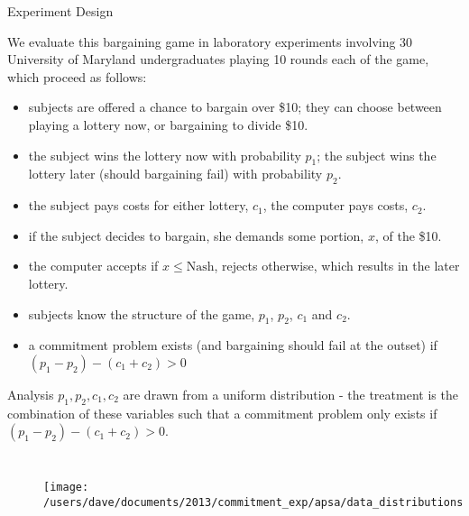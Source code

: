\documentclass[final]{beamer}
\newlength{\twocolwid}
\begin{document}
\begin{frame}[t]
\begin{columns}[t]
\begin{column}{\twocolwid}
\begin{block}{Experiment Design}
  
We evaluate this bargaining game in laboratory experiments involving 30 University of Maryland undergraduates playing 10 rounds each of the game, which proceed as follows:
        \begin{itemize}
        \item subjects are offered a chance to bargain over \$10; they can choose between playing a lottery now, or bargaining to divide \$10.
                \item the subject wins the lottery now with probability $p_1$; the subject wins the lottery later (should bargaining fail) with probability $p_2$.
                  \item the subject pays costs for either lottery, $c_1$, the computer pays costs, $c_2$.
        \item if the subject decides to bargain, she demands some portion, $x$, of the \$10.
        \item  the computer accepts if $x \leq \text{Nash}$, rejects otherwise, which results in the later lottery.
        \item subjects know the structure of the game, $p_1$, $p_2$, $c_1$ and $c_2$.
        \item a commitment problem exists (and bargaining should fail at the outset) if $(p_1-p_2)-(c_1+c_2)>0$
        \end{itemize}



     \begin{block}{Analysis}
         $p_1, p_2, c_1, c_2$ are drawn from a uniform distribution - the treatment is the combination of these variables such that a commitment problem only exists if $(p_1-p_2)-(c_1+c_2)>0$.
     
       \begin{columns}[T] 

     \begin{figure}[htb]
          \centering
          \texttt{[image: /users/dave/documents/2013/commitment\_exp/apsa/data\_distributions814.pdf]}
        \end{figure}

The treatment ($(p_1-p_2)-(c_1+c_2)>0$) is  randomly assigned and continuous. \\~\\ 

     \begin{figure}[htb]
          \centering
          \texttt{[image: /users/dave/documents/2013/commitment\_exp/apsa/demands\_correct.pdf]}
        \end{figure}
        

\end{columns}
\end{block}
\end{block}
\end{column}
\end{columns}
\end{frame}
\end{document}

